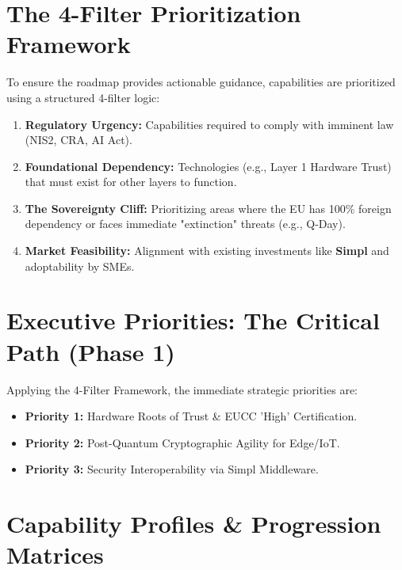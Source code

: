 \documentclass[12pt,a4paper]{article}
\begin{document}
\section{The 4-Filter Prioritization Framework}
To ensure the roadmap provides actionable guidance, capabilities are prioritized using a structured 4-filter logic:
\begin{enumerate}
    \item \textbf{Regulatory Urgency:} Capabilities required to comply with imminent law (NIS2, CRA, AI Act).
    \item \textbf{Foundational Dependency:} Technologies (e.g., Layer 1 Hardware Trust) that must exist for other layers to function.
    \item \textbf{The Sovereignty Cliff:} Prioritizing areas where the EU has 100\% foreign dependency or faces immediate "extinction" threats (e.g., Q-Day).
    \item \textbf{Market Feasibility:} Alignment with existing investments like \textbf{Simpl} and adoptability by SMEs.
\end{enumerate}

\section*{Executive Priorities: The Critical Path (Phase 1)}
Applying the 4-Filter Framework, the immediate strategic priorities are:
\begin{itemize}
    \item \textbf{Priority 1:} Hardware Roots of Trust \& EUCC 'High' Certification.
    \item \textbf{Priority 2:} Post-Quantum Cryptographic Agility for Edge/IoT.
    \item \textbf{Priority 3:} Security Interoperability via Simpl Middleware.
\end{itemize}

\section{Capability Profiles \& Progression Matrices}
\end{document}
